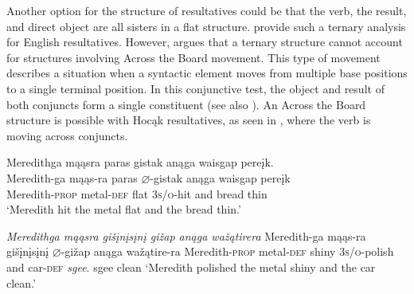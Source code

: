 \documentclass[output=paper]{LSP/langsci}
\begin{document}
Another option for the structure of resultatives could be that the verb, the result, and direct object are all sisters in a flat structure.  \citet{CarrierRandall1992} provide such a ternary analysis for English resultatives. However, \citet{Bowers1997} argues that a ternary structure cannot account for structures involving Across the Board movement. This type of movement describes a situation when a syntactic element moves from multiple base positions to a single terminal position. In this conjunctive test, the object and result of both conjuncts form a single constituent (see also \citealt{Li1999}). An Across the Board structure is possible with Hocąk resultatives, as seen in , where the verb is moving across conjuncts.

\begin{exe}
\ex\label{ex:rosen:26}
\begin{xlist}

\ex \glll Meredithga mąąsra paras gistak anąga waisgap pereįk. \\
Meredith-ga mąąs-ra paras {$\varnothing$}-gistak anąga waisgap pereįk\\
Meredith-\textsc{prop} metal-\textsc{def} flat \textsc{3s/o}-hit and bread thin\\
\glt `Meredith hit the metal flat and the bread thin.'

\ex \textit{Meredithga \hspace{1.58em} mąąsra \hspace{.9em} gišįnį{s}įnį \hspace{.1em}gižap  \hspace {2.4em} anąga wažątirera}  \newline Meredith-ga \hspace{1.18em} mąąs-ra \hspace {.5em} gišįnį{s}įnį {$\varnothing$}-gižap \hspace{1.3em} anąga wažątire-ra \newline Meredith-\textsc{prop} metal-\textsc{def} shiny \hspace{1.6em} \textsc{3s/o}-polish and \hspace{1em} car-\textsc{def} \newline\textit{sgee}. \newline
sgee \newline
clean \newline
`Meredith polished the metal shiny and the car clean.'

\end{xlist}
\end{exe}
 
\end{document}
